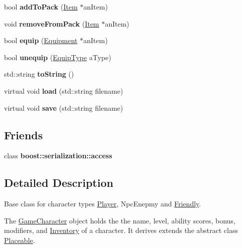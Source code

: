 \begin{DoxyCompactItemize}
bool {\bfseries add\+To\+Pack} (\hyperlink{class_item}{Item} $\ast$an\+Item)
\item 
\hypertarget{class_game_character_af8e3c23dd71472b27f3daa860e88beef}{}\label{class_game_character_af8e3c23dd71472b27f3daa860e88beef} 
void {\bfseries remove\+From\+Pack} (\hyperlink{class_item}{Item} $\ast$an\+Item)
\item 
\hypertarget{class_game_character_a8774e9795a985ae6ba05a6f29cd18074}{}\label{class_game_character_a8774e9795a985ae6ba05a6f29cd18074} 
bool {\bfseries equip} (\hyperlink{class_equipment}{Equipment} $\ast$an\+Item)
\item 
\hypertarget{class_game_character_a6a281827355113352486a9a71882b110}{}\label{class_game_character_a6a281827355113352486a9a71882b110} 
bool {\bfseries unequip} (\hyperlink{class_equip_type}{Equip\+Type} a\+Type)
\item 
\hypertarget{class_game_character_af8c976c875abf76993e716533a25a7b6}{}\label{class_game_character_af8c976c875abf76993e716533a25a7b6} 
std\+::string {\bfseries to\+String} ()
\item 
\hypertarget{class_game_character_ad3656092f8da6899751616597295418b}{}\label{class_game_character_ad3656092f8da6899751616597295418b} 
virtual void {\bfseries load} (std\+::string filename)
\item 
\hypertarget{class_game_character_a37ea5f779910d981baec0ae871a1c097}{}\label{class_game_character_a37ea5f779910d981baec0ae871a1c097} 
virtual void {\bfseries save} (std\+::string filename)
\end{DoxyCompactItemize}
\subsection*{Friends}
\begin{DoxyCompactItemize}
\item 
\hypertarget{class_game_character_ac98d07dd8f7b70e16ccb9a01abf56b9c}{}\label{class_game_character_ac98d07dd8f7b70e16ccb9a01abf56b9c} 
class {\bfseries boost\+::serialization\+::access}
\end{DoxyCompactItemize}


\subsection{Detailed Description}
Base class for character types \hyperlink{class_player}{Player}, Npc\+Enepmy and \hyperlink{class_friendly}{Friendly}. 

The \hyperlink{class_game_character}{Game\+Character} object holds the the name, level, ability scores, bonus, modifiers, and \hyperlink{class_inventory}{Inventory} of a character. It derives extends the abstract class \hyperlink{class_placeable}{Placeable}. 

